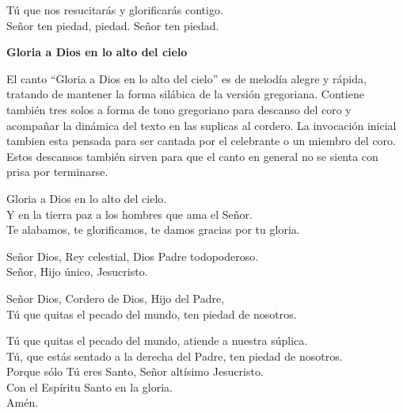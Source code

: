 \documentclass[12pt, letterpaper]{report}
\begin{document}
    \noindent
    \LARGE T\'u que nos resucitar\'as y glorificar\'as contigo.\\ Se\~nor ten piedad, piedad. Se\~nor ten piedad.
    \clearpage



    
    \begin{center}
        \Huge {\bfseries Gloria a Dios en lo alto del cielo}
    \end{center}

    \Large El canto ``Gloria a Dios en lo alto del cielo'' es de melod\'ia alegre y r\'apida, tratando de mantener la forma sil\'abica de la versi\'on gregoriana. Contiene tambi\'en tres solos a forma de tono gregoriano para descanso del coro y acompa\~nar la din\'amica del texto en las suplicas al cordero. La invocaci\'on inicial tambien esta pensada para ser cantada por el celebrante o un miembro del coro.  Estos descansos tambi\'en sirven para que el canto en general no se sienta con prisa por terminarse.

    \noindent
    \LARGE Gloria a Dios en lo alto del cielo.\\
    Y en la tierra paz a los hombres que ama el Se\~nor. \\
    Te alabamos, te glorificamos, te damos gracias por tu gloria.

    \noindent
    Se\~nor Dios, Rey celestial, Dios Padre todopoderoso. \\
    Se\~nor, Hijo \'unico, Jesucristo.

    \noindent
    Se\~nor Dios, Cordero de Dios, Hijo del Padre, \\
    T\'u que quitas el pecado del mundo, ten piedad de nosotros.

    \noindent
    T\'u que quitas el pecado del mundo, atiende a nuestra s\'uplica. \\
    T\'u, que est\'as sentado a la derecha del Padre, ten piedad de nosotros.\\
    Porque s\'olo T\'u eres Santo, Se\~nor alt\'isimo Jesucristo. \\
    Con el Esp\'iritu Santo en la gloria.\\
    Am\'en.
    \clearpage
\end{document}
